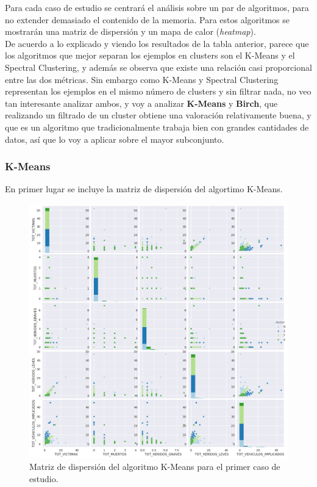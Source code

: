 	Para cada caso de estudio se centrará el análisis sobre un par de algoritmos, para no extender demasiado el contenido de la memoria. Para estos algoritmos se mostrarán una matriz de dispersión y un mapa de calor (\textit{heatmap}).\\

	De acuerdo a lo explicado y viendo los resultados de la tabla anterior, parece que los algoritmos que mejor separan los ejemplos en clusters son el K-Means y el Spectral Clustering, y además se observa que existe una relación casi proporcional entre las dos métricas. Sin embargo como K-Means y Spectral Clustering representan los ejemplos en el mismo número de clusters y sin filtrar nada, no veo tan interesante analizar ambos, y voy a analizar \textbf{K-Means} y \textbf{Birch}, que realizando un filtrado de un cluster obtiene una valoración relativamente buena, y que es un algoritmo que tradicionalmente trabaja bien con grandes cantidades de datos, así que lo voy a aplicar sobre el mayor subconjunto.

	\subsubsection{K-Means}
	En primer lugar se incluye la matriz de dispersión del algortimo K-Means.
	
	\begin{figure}[H]
		\centering
		\includegraphics[scale=0.5]{plots/K-Means-HighwayAccidents-ScatterMatrix.png}
		\caption{Matriz de dispersión del algoritmo K-Means para el primer caso de estudio.}
	\end{figure}

